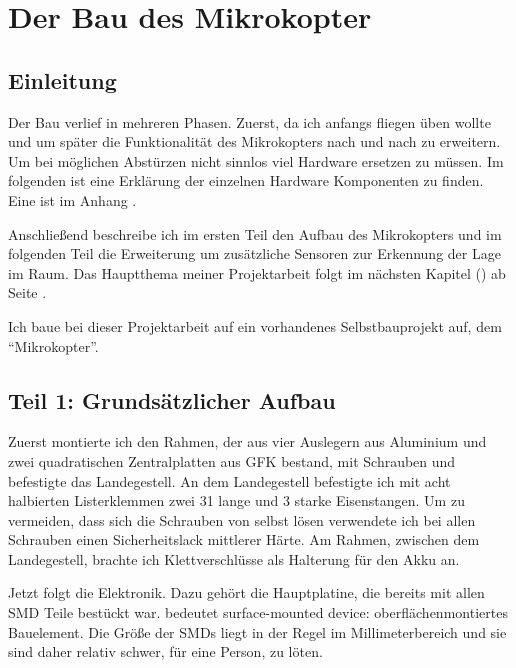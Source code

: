 \section{Der Bau des Mikrokopter}
\label{sec:bau:Mikrokopter}

\subsection{Einleitung}
\label{subsec:bau:Mikrokopter:Einleitung}

Der Bau verlief in mehreren Phasen.
Zuerst, da ich anfangs fliegen üben wollte
und um später die Funktionalität des Mikrokopters nach und nach zu erweitern.
Um bei möglichen Abstürzen nicht sinnlos viel Hardware ersetzen zu müssen.
Im folgenden ist eine Erklärung der einzelnen Hardware Komponenten zu finden.
Eine  ist im Anhang .

Anschließend beschreibe ich im ersten Teil den Aufbau des Mikrokopters
und im folgenden Teil die Erweiterung um zusätzliche Sensoren
zur Erkennung der Lage im Raum.
Das Hauptthema meiner Projektarbeit folgt im nächsten Kapitel
()
ab Seite \pageref{sec:autonomes_fliegen}.

Ich baue bei dieser Projektarbeit auf ein vorhandenes Selbstbauprojekt auf,
dem \enquote{Mikrokopter}.



\subsection{Teil 1: Grundsätzlicher Aufbau}
\label{subsec:bau:Mikrokopter:teil1}

Zuerst montierte ich den Rahmen, der aus vier Auslegern aus Aluminium
und zwei quadratischen Zentralplatten aus \ac{GFK} bestand,
mit Schrauben und befestigte das Landegestell.
An dem Landegestell befestigte ich mit acht halbierten Listerklemmen
zwei \unit{31}{\centi\metre} lange und \unit{3}{\milli\metre} starke Eisenstangen.
Um zu vermeiden, dass sich die Schrauben
von selbst lösen verwendete ich bei allen Schrauben einen Sicherheitslack mittlerer Härte.
Am Rahmen, zwischen dem Landegestell, brachte ich Klettverschlüsse als Halterung für den Akku an.

Jetzt folgt die Elektronik.
Dazu gehört die Hauptplatine,
die bereits mit allen \acs{SMD} Teile bestückt war.
 bedeutet surface-mounted device: oberflächenmontiertes Bauelement.
Die Größe der \ac{SMD}s liegt in der Regel
im Millimeterbereich und sie sind daher relativ schwer, für eine Person, zu löten.

